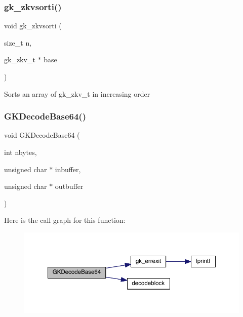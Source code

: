 \subsubsection{\texorpdfstring{gk\+\_\+zkvsorti()}{gk\_zkvsorti()}}
{\footnotesize\ttfamily void gk\+\_\+zkvsorti (\begin{DoxyParamCaption}\item[{size\+\_\+t}]{n,  }\item[{gk\+\_\+zkv\+\_\+t $\ast$}]{base }\end{DoxyParamCaption})}

Sorts an array of gk\+\_\+zkv\+\_\+t in increasing order \mbox{\label{a00077_a489bc1aa604dc1c8bc1fcb4e404de26a}} 
\subsubsection{\texorpdfstring{G\+K\+Decode\+Base64()}{GKDecodeBase64()}}
{\footnotesize\ttfamily void G\+K\+Decode\+Base64 (\begin{DoxyParamCaption}\item[{int}]{nbytes,  }\item[{unsigned char $\ast$}]{inbuffer,  }\item[{unsigned char $\ast$}]{outbuffer }\end{DoxyParamCaption})}

Here is the call graph for this function\+:\nopagebreak
\begin{figure}[H]
\begin{center}
\leavevmode
\includegraphics[width=350pt]{a00077_a489bc1aa604dc1c8bc1fcb4e404de26a_cgraph}
\end{center}
\end{figure}
\mbox{\label{a00077_a63253b29fd38d41463013481ce7e7f0a}} 
